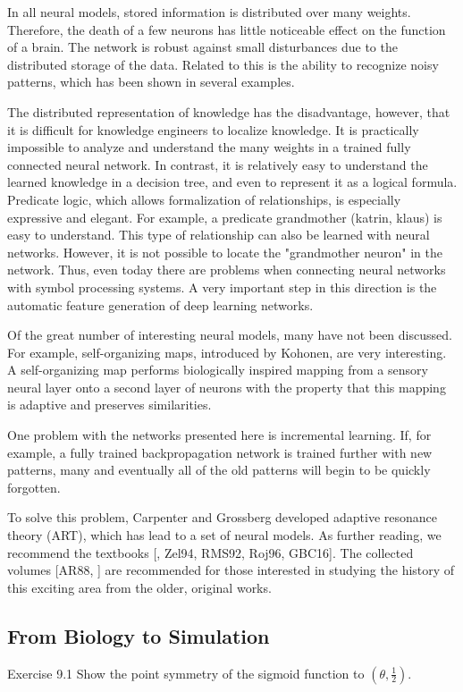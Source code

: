 \documentclass[10pt]{book}
\begin{document}
In all neural models, stored information is distributed over many weights. Therefore, the death of a few neurons has little noticeable effect on the function of a brain. The network is robust against small disturbances due to the distributed storage of the data. Related to this is the ability to recognize noisy patterns, which has been shown in several examples.

The distributed representation of knowledge has the disadvantage, however, that it is difficult for knowledge engineers to localize knowledge. It is practically impossible to analyze and understand the many weights in a trained fully connected neural network. In contrast, it is relatively easy to understand the learned knowledge in a decision tree, and even to represent it as a logical formula. Predicate logic, which allows formalization of relationships, is especially expressive and elegant. For example, a predicate grandmother (katrin, klaus) is easy to understand. This type of relationship can also be learned with neural networks. However, it is not possible to locate the "grandmother neuron" in the network. Thus, even today there are problems when connecting neural networks with symbol processing systems. A very important step in this direction is the automatic feature generation of deep learning networks.

Of the great number of interesting neural models, many have not been discussed. For example, self-organizing maps, introduced by Kohonen, are very interesting. A self-organizing map performs biologically inspired mapping from a sensory neural layer onto a second layer of neurons with the property that this mapping is adaptive and preserves similarities.

One problem with the networks presented here is incremental learning. If, for example, a fully trained backpropagation network is trained further with new patterns, many and eventually all of the old patterns will begin to be quickly forgotten.

To solve this problem, Carpenter and Grossberg developed adaptive resonance theory (ART), which has lead to a set of neural models.
As further reading, we recommend the textbooks [\cite{bishop2005neural}, Zel94, RMS92, Roj96, GBC16]. The collected volumes [AR88, \cite{anderson1990neurocomputing}] are recommended for those interested in studying the history of this exciting area from the older, original works.

\subsection{From Biology to Simulation}
Exercise 9.1 Show the point symmetry of the sigmoid function to $\left(\theta, \frac{1}{2}\right)$.
\end{document}
